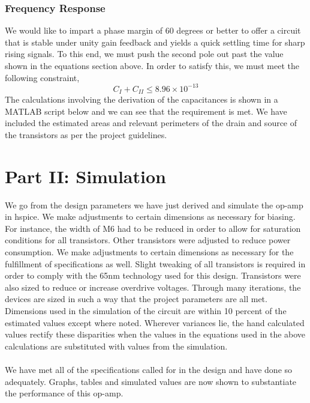 \documentclass[]{article}
\begin{document}
			\subsubsection{Frequency Response}
				$$$$
				We would like to impart a phase margin of 60 degrees or better to offer a circuit that is stable under unity gain feedback and yields a quick settling time for sharp rising signals. To this end, we must push the second pole out past the value shown in the equations section above. In order to satisfy this, we must meet the following constraint,
				$$C_{I}+C_{II} \le 8.96\times 10^{-13}$$
				The calculations involving the derivation of the capacitances is shown in a\\ MATLAB script below and we can see that the requirement is met. We have included the estimated areas and relevant perimeters of the drain and source of the transistors as per the project guidelines.
		
				\pagebreak
				
					
		
	\section{Part II: Simulation}
		We go from the design parameters we have just derived and simulate the op-amp in hspice. We make adjustments to certain dimensions as necessary for biasing. For instance, the width of M6 had to be reduced in order to allow for saturation conditions for all transistors. Other transistors were adjusted to reduce power consumption. We make adjustments to certain dimensions as necessary for the fulfillment of specifications as well. Slight tweaking of all transistors is required in order to comply with the 65nm technology used for this design. Transistors were also sized to reduce or increase overdrive voltages. Through many iterations, the devices are sized in such a way that the project parameters are all met. Dimensions used in the simulation of the circuit are within 10 percent of the estimated values except where noted. Wherever variances lie, the hand calculated values rectify these disparities when the values in the equations used in the above calculations are substituted with values from the simulation.\\ \\
		We have met all of the specifications called for in the design and have done so adequately. Graphs, tables and simulated values are now shown to substantiate the performance of this op-amp.
		
\end{document}
